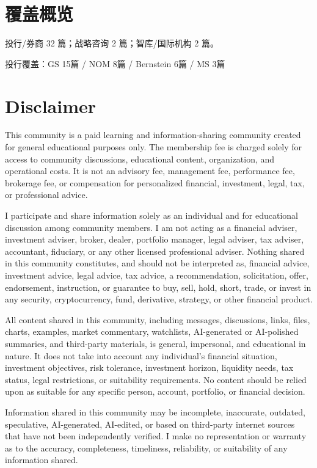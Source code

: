 \documentclass[11pt]{ctexart}
\begin{document}
\section{覆盖概览}
投行/券商 32 篇；战略咨询 2 篇；智库/国际机构 2 篇。\par
投行覆盖：GS 15篇 / NOM 8篇 / Bernstein 6篇 / MS 3篇\par
\section{Disclaimer}
{\scriptsize\color{refgray}
This community is a paid learning and information-sharing community created for general educational purposes only. The membership fee is charged solely for access to community discussions, educational content, organization, and operational costs. It is not an advisory fee, management fee, performance fee, brokerage fee, or compensation for personalized financial, investment, legal, tax, or professional advice.\par
I participate and share information solely as an individual and for educational discussion among community members. I am not acting as a financial adviser, investment adviser, broker, dealer, portfolio manager, legal adviser, tax adviser, accountant, fiduciary, or any other licensed professional adviser. Nothing shared in this community constitutes, and should not be interpreted as, financial advice, investment advice, legal advice, tax advice, a recommendation, solicitation, offer, endorsement, instruction, or guarantee to buy, sell, hold, short, trade, or invest in any security, cryptocurrency, fund, derivative, strategy, or other financial product.\par
All content shared in this community, including messages, discussions, links, files, charts, examples, market commentary, watchlists, AI-generated or AI-polished summaries, and third-party materials, is general, impersonal, and educational in nature. It does not take into account any individual's financial situation, investment objectives, risk tolerance, investment horizon, liquidity needs, tax status, legal restrictions, or suitability requirements. No content should be relied upon as suitable for any specific person, account, portfolio, or financial decision.\par
Information shared in this community may be incomplete, inaccurate, outdated, speculative, AI-generated, AI-edited, or based on third-party internet sources that have not been independently verified. I make no representation or warranty as to the accuracy, completeness, timeliness, reliability, or suitability of any information shared.\par
}
\end{document}
